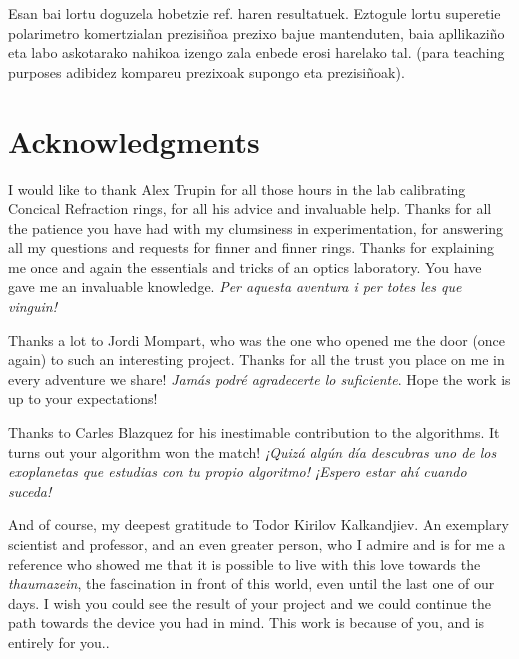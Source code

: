 \documentclass[11pt, a4paper, twoside]{article} %
\begin{document}

Esan bai lortu doguzela hobetzie ref. haren resultatuek. Eztogule lortu superetie polarimetro komertzialan prezisiñoa prezixo bajue mantenduten, baia apllikaziño eta labo askotarako nahikoa izengo zala enbede erosi harelako tal. (para teaching purposes adibidez kompareu prezixoak supongo eta prezisiñoak).

\section*{Acknowledgments}
I would like to thank Alex Trupin for all those hours in the lab calibrating Concical Refraction rings, for all his advice and invaluable help. Thanks for all the patience you have had with my clumsiness in experimentation, for answering all my questions and requests for finner and finner rings. Thanks for explaining me once and again the essentials and tricks of an optics laboratory. You have gave me an invaluable knowledge. {\em Per aquesta aventura i per totes les que vinguin!}

Thanks a lot to Jordi Mompart, who was the one who opened me the door (once again) to such an interesting project. Thanks for all the trust you place on me in every adventure we share! {\em Jamás podré agradecerte lo suficiente}. Hope the work is up to your expectations! 

Thanks to Carles Blazquez for his inestimable contribution to the algorithms. It turns out your algorithm won the match! {\em ¡Quizá algún día descubras uno de los exoplanetas que estudias con tu propio algoritmo! ¡Espero estar ahí cuando suceda!}

And of course, my deepest gratitude to Todor Kirilov Kalkandjiev. An exemplary scientist and professor, and an even greater person, who I admire and is for me a reference who showed me that it is possible to live with this love towards the {\em thaumazein}, the fascination in front of this world, even until the last one of our days. I wish you could see the result of your project and we could continue the path towards the device you had in mind. This work is because of you, and is entirely for you.\vspace{0.1cm}.



\newpage

\fancyhead[OR]{ }
\end{document}
